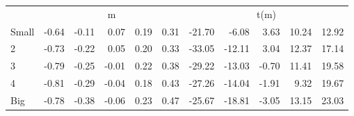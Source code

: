 \begin{table}[!ht]
\begin{tabular}{lrrrrrrrrrr}
      & \multicolumn{5}{c}{m} & \multicolumn{5}{c}{t(m)}
    
    \\
      \cmidrule(r){2-6} \cmidrule(r){7-11}

    Small   & -0.64  & -0.11  & 0.07  & 0.19  & 0.31  & -21.70  & -6.08  & 3.63  & 10.24  & 12.92  \\
         2  & -0.73  & -0.22  & 0.05  & 0.20  & 0.33  & -33.05  & -12.11  & 3.04  & 12.37  & 17.14  \\
         3  & -0.79  & -0.25  & -0.01  & 0.22  & 0.38  & -29.22  & -13.03  & -0.70  & 11.41  & 19.58  \\
         4  & -0.81  & -0.29  & -0.04  & 0.18  & 0.43  & -27.26  & -14.04  & -1.91  & 9.32  & 19.67  \\
    Big     & -0.78  & -0.38  & -0.06  & 0.23  & 0.47  & -25.67  & -18.81  & -3.05  & 13.15  & 23.03  \\

  

  \bottomrule
\end{tabular}
\label{tbl:25_Size_Prior_C97b}
\end{table}